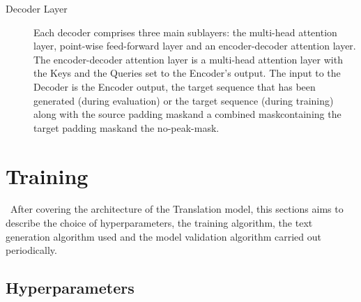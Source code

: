 \documentclass[12pt,a4paper,twoside,openright]{report}
\newenvironment{specialfootnote}
    {
    \renewcommand*{\thefootnote}{\fnsymbol{footnote}}
    }
    {
    \renewcommand*{\thefootnote}{\arabic{footnote}}
    }
\begin{document}
\begin{description}
\begin{specialfootnote}
\item[Decoder Layer]
Each decoder comprises three main sublayers: the multi-head attention layer, point-wise feed-forward layer and an encoder-decoder attention layer. The encoder-decoder attention layer is a multi-head attention layer with the Keys and the Queries set to the Encoder's output. The input to the Decoder is the Encoder output, the target sequence that has been generated (during evaluation) or the target sequence (during training) along with the source padding mask\footnotemark[8] and a combined mask\footnotemark[8] containing the target padding mask\footnotemark[8] and the no-peak-mask\footnotemark[8].

\end{specialfootnote}
\end{description}



\section{Training}
\label{training}\
After covering the architecture of the Translation model, this sections aims to describe the choice of hyperparameters, the training algorithm, the text generation algorithm used and the model validation algorithm carried out periodically.

\subsection{Hyperparameters}
\label{hyperparameters}
\end{document}

